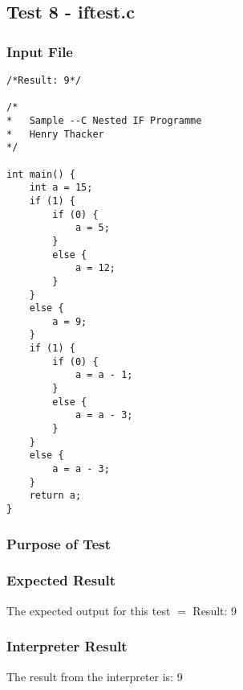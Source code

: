 \subsection{Test 8 - iftest.c}
\subsubsection{Input File}
\begin{lstlisting}[showstringspaces=false,breaklines=true,backgroundcolor=\color{light-gray}, captionpos=b]
/*Result: 9*/

/*
*	Sample --C Nested IF Programme
*	Henry Thacker
*/

int main() {
	int a = 15;
	if (1) {
		if (0) {
			a = 5;
		}
		else {
			a = 12;
		}
	}
	else {
		a = 9;
	}
	if (1) {
		if (0) {
			a = a - 1;
		}
		else {
			a = a - 3;
		}
	}
	else {
		a = a - 3;
	}
	return a;
}
\end{lstlisting}\subsubsection{Purpose of Test}

\subsubsection{Expected Result}
The expected output for this test $=$ Result: 9
\subsubsection{Interpreter Result}
The result from the interpreter is: 9
